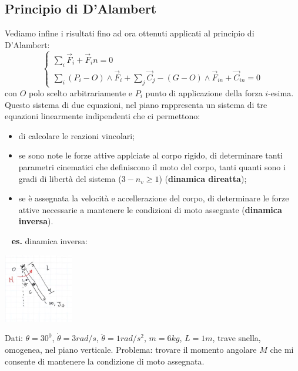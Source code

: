 \subsection*{Principio di D'Alambert}
Vediamo infine i risultati fino ad ora ottenuti applicati al principio di D'Alambert:
\[
    \begin{cases}
        \sum_i \vec{F}_i + \vec{F}_in = 0\\
        \sum_i (P_i - O) \land \vec{F}_i + \sum_j \vec{C}_j - (G-O) \land \vec{F}_{in} + \vec{C}_{in} = 0
    \end{cases}
\]
con $O$ polo scelto arbitrariamente e $P_i$ punto di applicazione della forza $i$-esima.\newline
\newline
Questo sistema di due equazioni, nel piano rappresenta un sistema di tre equazioni linearmente indipendenti che ci permettono:
\begin{itemize}
    \item di calcolare le reazioni vincolari;
    \item se sono note le forze attive applciate al corpo rigido, di determinare tanti parametri cinematici che definiscono il moto del corpo, tanti quanti sono i gradi di libertà del sistema ($3-n_v \geq 1$) (\textbf{dinamica direatta});
    \item se è assegnata la velocità e accellerazione del corpo, di determinare le forze attive necessarie a mantenere le condizioni di moto assegnate (\textbf{dinamica inversa}).
\end{itemize}
\ \newline
\newline
\textbf{es.} dinamica inversa:
\begin{center}
    \includegraphics[height=3cm]{../lezione9/img4.JPG}
\end{center}
Dati: $\theta = 30^0$, $\dot{\theta} = 3 rad/s$, $\ddot{\theta} = 1 rad/s^2$, $m = 6 kg$, $L = 1m$, trave snella, omogenea, nel piano verticale.\newline
Problema: trovare il momento angolare $M$ che mi consente di mantenere la condizione di moto assegnata.\newline
